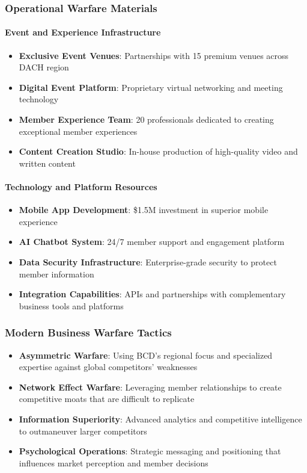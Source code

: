 \subsubsection{Operational Warfare Materials}

\paragraph{Event and Experience Infrastructure}
\begin{itemize}
    \item \textbf{Exclusive Event Venues}: Partnerships with 15 premium venues across DACH region
    \item \textbf{Digital Event Platform}: Proprietary virtual networking and meeting technology
    \item \textbf{Member Experience Team}: 20 professionals dedicated to creating exceptional member experiences
    \item \textbf{Content Creation Studio}: In-house production of high-quality video and written content
\end{itemize}

\paragraph{Technology and Platform Resources}
\begin{itemize}
    \item \textbf{Mobile App Development}: \$1.5M investment in superior mobile experience
    \item \textbf{AI Chatbot System}: 24/7 member support and engagement platform
    \item \textbf{Data Security Infrastructure}: Enterprise-grade security to protect member information
    \item \textbf{Integration Capabilities}: APIs and partnerships with complementary business tools and platforms
\end{itemize}

\subsubsection{Modern Business Warfare Tactics}

\begin{itemize}
    \item \textbf{Asymmetric Warfare}: Using BCD's regional focus and specialized expertise against global competitors' weaknesses
    \item \textbf{Network Effect Warfare}: Leveraging member relationships to create competitive moats that are difficult to replicate
    \item \textbf{Information Superiority}: Advanced analytics and competitive intelligence to outmaneuver larger competitors
    \item \textbf{Psychological Operations}: Strategic messaging and positioning that influences market perception and member decisions
\end{itemize}

